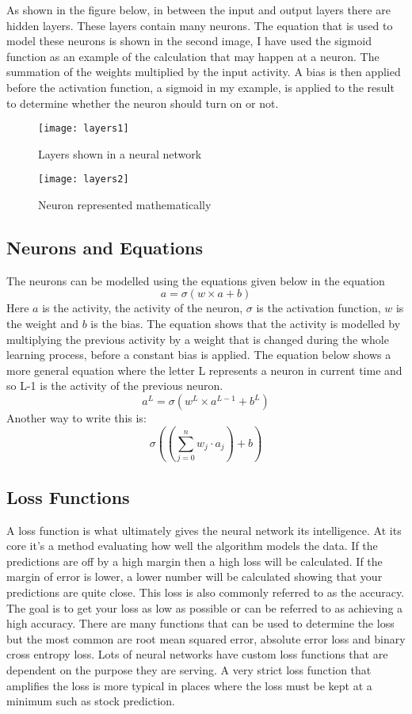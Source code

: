 \documentclass{article}
\begin{document}
As shown in the figure below, in between the input and output layers there are hidden layers.  These layers contain many neurons. The equation that is used to model these neurons is shown in the second image, I have used the sigmoid function as an example of the calculation that may happen at a neuron. The summation of the weights multiplied by the input activity. A bias is then applied before the activation function, a sigmoid in my example, is applied to the result to determine whether the neuron should turn on or not.
\begin{figure*}[h!]
            \centering
            \texttt{[image: layers1]}
            \caption{Layers shown in a neural network}
        \end{figure*}
\begin{figure}[h!]
            \centering
            \texttt{[image: layers2]}
            \caption{Neuron represented mathematically}
        \end{figure}

\subsection{Neurons and Equations}
The neurons can be modelled using the equations given below in the equation $$a = \sigma(w \times a + b)$$
Here $a$ is the activity, the activity of the neuron, $\sigma$ is the activation function, $w$ is the weight and $b$ is the bias.
The equation shows that the activity is modelled by multiplying the previous activity by a weight that is changed during the whole learning process, before a constant bias is applied. The equation below shows a more general equation where the letter L represents a neuron in current time and so L-1 is the activity of the previous neuron.
$$a^{L} = \sigma(w^{L}\times a^{L-1} + b^{L})$$
Another way to write this is:\\
$$\sigma((\sum_{j=0}^{n}w_j\cdot a_j)+b)$$

\subsection{Loss Functions}

A loss function is what ultimately gives the neural network its intelligence. At its core it’s a method evaluating how well the algorithm models the data. If the predictions are off by a high margin then a high loss will be calculated. If the margin of error is lower, a lower number will be calculated showing that your predictions are quite close. This loss is also commonly referred to as the accuracy. The goal is to get your loss as low as possible or can be referred to as achieving a high accuracy.  There are many functions that can be used to determine the loss but the most common are root mean squared error, absolute error loss and binary cross entropy loss. Lots of neural networks have custom loss functions that are dependent on the purpose they are serving. A very strict loss function that amplifies the loss is more typical in places where the loss must be kept at a minimum such as stock prediction.
\end{document}
